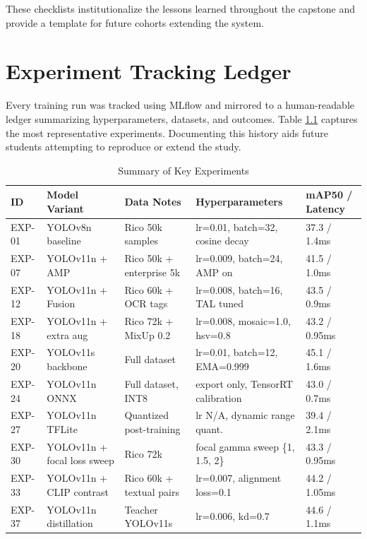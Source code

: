 \documentclass[11pt,a4paper]{report}
\begin{document}
These checklists institutionalize the lessons learned throughout the capstone and provide a template for future cohorts extending the system.

\chapter{Experiment Tracking Ledger}
Every training run was tracked using MLflow and mirrored to a human-readable ledger summarizing hyperparameters, datasets, and outcomes. Table \ref{tab:experiments} captures the most representative experiments. Documenting this history aids future students attempting to reproduce or extend the study.

\begin{table}[H]
\centering
\caption{Summary of Key Experiments}
\label{tab:experiments}
\small
\begin{tabular}{lllll}
    \toprule
    \textbf{ID} & \textbf{Model Variant} & \textbf{Data Notes} & \textbf{Hyperparameters} & \textbf{mAP50 / Latency} \\ \midrule
    EXP-01 & YOLOv8n baseline & Rico 50k samples & lr=0.01, batch=32, cosine decay & 37.3 / 1.4ms \\
    EXP-07 & YOLOv11n + AMP & Rico 50k + enterprise 5k & lr=0.009, batch=24, AMP on & 41.5 / 1.0ms \\
    EXP-12 & YOLOv11n + Fusion & Rico 60k + OCR tags & lr=0.008, batch=16, TAL tuned & 43.5 / 0.9ms \\
    EXP-18 & YOLOv11n + extra aug & Rico 72k + MixUp 0.2 & lr=0.008, mosaic=1.0, hsv=0.8 & 43.2 / 0.95ms \\
    EXP-20 & YOLOv11s backbone & Full dataset & lr=0.01, batch=12, EMA=0.999 & 45.1 / 1.6ms \\
    EXP-24 & YOLOv11n ONNX & Full dataset, INT8 & export only, TensorRT calibration & 43.0 / 0.7ms \\
    EXP-27 & YOLOv11n TFLite & Quantized post-training & lr N/A, dynamic range quant. & 39.4 / 2.1ms \\
    EXP-30 & YOLOv11n + focal loss sweep & Rico 72k & focal gamma sweep \{1, 1.5, 2\} & 43.3 / 0.95ms \\
    EXP-33 & YOLOv11n + CLIP contrast & Rico 60k + textual pairs & lr=0.007, alignment loss=0.1 & 44.2 / 1.05ms \\
    EXP-37 & YOLOv11n distillation & Teacher YOLOv11s & lr=0.006, kd=0.7 & 44.6 / 1.1ms \\
    \bottomrule
\end{tabular}
\end{table}
\end{document}
